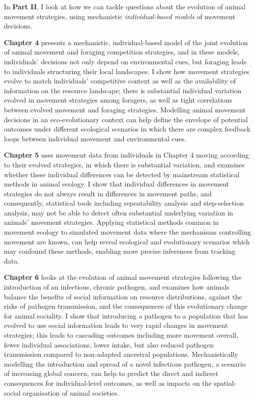 \noindent In \textbf{Part II}, I look at how we can tackle questions about the evolution of animal movement strategies, using mechanistic \textit{individual-based models} of movement decisions.

\medskip

\noindent \textbf{Chapter 4} presents a mechanistic, individual-based model of the joint evolution of animal movement and foraging competition strategies, and in these models, individuals' decisions not only depend on environmental cues, but foraging leads to individuals structuring their local landscapes.
I show how movement strategies evolve to match individuals' competitive context as well as the availability of information on the resource landscape; there is substantial individual variation evolved in movement strategies among foragers, as well as tight correlations between evolved movement and foraging strategies.
Modelling animal movement decisions in an eco-evolutionary context can help define the envelope of potential outcomes under different ecological scenarios in which there are complex feedback loops between individual movement and environmental cues.

\medskip

\noindent \textbf{Chapter 5} uses movement data from individuals in Chapter 4 moving according to their evolved strategies, in which there is substantial variation, and examines whether these individual differences can be detected by mainstream statistical methods in animal ecology.
I show that individual differences in movement strategies do not always result in differences in movement paths, and consequently, statistical tools including repeatability analysis and step-selection analysis, may not be able to detect often substantial underlying variation in animals' movement strategies.
Applying statistical methods common in movement ecology to simulated movement data where the mechanisms controlling movement are known, can help reveal ecological and evolutionary scenarios which may confound these methods, enabling more precise inferences from tracking data.

\medskip

\noindent \textbf{Chapter 6} looks at the evolution of animal movement strategies following the introduction of an infectious, chronic pathogen, and examines how animals balance the benefits of social information on resource distributions, against the risks of pathogen transmission, and the consequences of this evolutionary change for animal sociality.
I show that introducing a pathogen to a population that has evolved to use social information leads to very rapid changes in movement strategies; this leads to cascading outcomes including more movement overall, fewer individual associations, lower intake, but also reduced pathogen transmission compared to non-adapted ancestral populations.
Mechanistically modelling the introduction and spread of a novel infectious pathogen, a scenario of increasing global concern, can help to predict the direct and indirect consequences for individual-level outcomes, as well as impacts on the spatial-social organisation of animal societies.

\medskip


\endgroup

\vfill

\cleardoublepage
